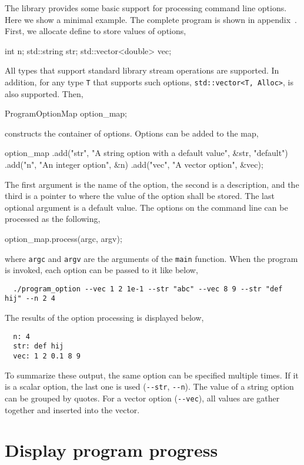 The library provides some basic support for processing command line options.
Here we show a minimal example. The complete program is shown in
appendix~. First, we
allocate define to store values of options,
\begin{cppcode}
  int n;
  std::string str;
  std::vector<double> vec;
\end{cppcode}
All types that support standard library \io stream operations are supported. In
addition, for any type \verb|T| that supports such options,
\verb|std::vector<T, Alloc>|, is also supported. Then,
\begin{cppcode}
  ProgramOptionMap option_map;
\end{cppcode}
constructs the container of options. Options can be added to the map,
\begin{cppcode}
  option_map
      .add("str", "A string option with a default value", &str, "default")
      .add("n", "An integer option", &n)
      .add("vec", "A vector option", &vec);
\end{cppcode}
The first argument is the name of the option, the second is a description, and
the third is a pointer to where the value of the option shall be stored. The
last optional argument is a default value. The options on the command line can
be processed as the following,
\begin{cppcode}
  option_map.process(argc, argv);
\end{cppcode}
where \verb|argc| and \verb|argv| are the arguments of the \verb|main|
function. When the program is invoked, each option can be passed to it like
below,
\begin{Verbatim}
  ./program_option --vec 1 2 1e-1 --str "abc" --vec 8 9 --str "def hij" --n 2 4
\end{Verbatim}
The results of the option processing is displayed below,
\begin{Verbatim}
  n: 4
  str: def hij
  vec: 1 2 0.1 8 9
\end{Verbatim}
To summarize these output, the same option can be specified multiple times. If
it is a scalar option, the last one is used (\verb|--str|, \verb|--n|). The
value of a string option can be grouped by quotes. For a vector option
(\verb|--vec|), all values are gather together and inserted into the vector.

\section{Display program progress}
\label{sec:Display program progress}

